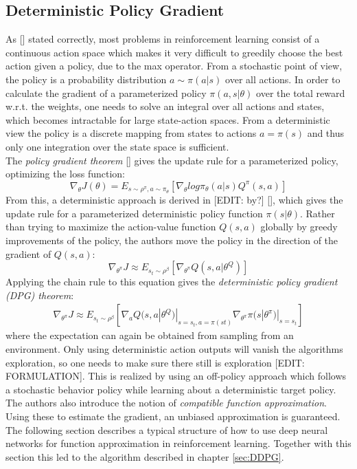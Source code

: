 \subsection{Deterministic Policy Gradient}
\label{sec:DPG}
\nocite{lillicrap2015continuous}
As [\cite{lillicrap2015continuous}] stated correctly, most problems in reinforcement learning consist of a continuous action space which makes it very difficult to greedily choose the best action given a policy, due to the max operator. From a stochastic point of view, the policy is a probability distribution $a\sim\pi(a|s)$ over all actions. In order to calculate the gradient of a parameterized policy $\pi(a,s|\theta)$ over the total reward w.r.t. the weights, one needs to solve an integral over all actions and states, which becomes intractable for large state-action spaces.
From a deterministic view the policy is a discrete mapping from states to actions $a=\pi(s)$ and thus only one integration over the state space is sufficient.\\ 
The \textit{policy gradient theorem} [\cite{silver2014deterministic}] gives the update rule for a parameterized policy, optimizing the loss function: 
\[
\nabla_{\theta}J(\theta)=E_{s\sim\rho^\pi,a\sim\pi_\theta}
\left[\nabla_\theta log \pi_\theta(a|s)Q^\pi(s,a)\right] 
\]
From this, a deterministic approach is derived in [EDIT: by?] [\cite{silver2014deterministic}], which gives the update rule for a parameterized deterministic policy function $\pi(s|\theta)$. Rather than trying to maximize the action-value function $Q(s,a)$ globally by greedy improvements of the policy, the authors move the policy in the direction of the gradient of $Q(s,a)$:
\[
\nabla_{\theta^\pi}J\approx E_{s_t\sim\rho^\beta}\left[\nabla_{\theta^\pi}Q(s,a|\theta^Q)\right]
\]
Applying the chain rule to this equation gives the \textit{deterministic policy gradient (DPG) theorem}:
\begin{align*}
\nabla_{\theta^\pi}J\approx E_{s_t\sim\rho^\beta}\left[\nabla_aQ(s,a|\theta^Q)|_{s=s_t,a=\pi(st)} \nabla_{\theta^\pi}\pi(s|\theta^\pi)|_{s=s_t}\right]
\end{align*}
where the expectation can again be obtained from sampling from an environment.
Only using deterministic action outputs will vanish the algorithms exploration, so one needs to make sure there still is exploration [EDIT: FORMULATION]. This is realized by using an off-policy approach which follows a stochastic behavior policy while learning about a deterministic target policy. The authors also introduce the notion of \textit{compatible function approximation}. Using these to estimate the gradient, an unbiased approximation is guaranteed.\\
The following section describes a typical structure of how to use deep neural networks for function approximation in reinforcement learning. Together with this section this led to the algorithm described in chapter \ref{sec:DDPG}.

